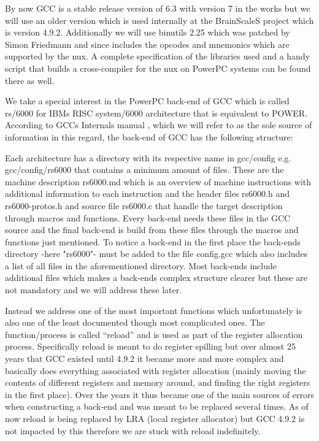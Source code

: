 By now GCC is a stable release version of 6.3 with version 7 in the works but we will use an older version which is used internally at the BrainScaleS project which is version 4.9.2.
Additionally we will use binutils 2.25 which was patched by Simon Friedmann and since includes the opcodes and mnemonics which are supported by the nux.
A complete specification of the libraries used and a handy script that builds a cross-compiler for the nux on PowerPC systems can be found there as well.

We take a special interest in the PowerPC back-end of GCC which is called rs/6000 for IBMs RISC system/6000 architecture that is equivalent to POWER.
According to GCCs Internals manual \cite{GCCint}, which we will refer to as the sole source of information in this regard, the back-end of GCC has the following structure:

Each architecture has a directory with its respective name in gcc/config e.g. gcc/config/rs6000 that contains a minimum amount of files.
These are the machine description rs6000.md which is an overview of machine instructions with additional information to each instruction and the header files rs6000.h and rs6000-protos.h and source file rs6000.c that handle the target description through macros and functions.
Every back-end needs these files in the GCC source and the final back-end is build from these files through the macros and functions just mentioned.
To notice a back-end in the first place the back-ends directory -here "rs6000"- must be added to the file config.gcc which also includes a list of all files in the aforementioned directory.
Most back-ends include additional files which makes a back-ends complex structure clearer but these are not mandatory and we will address these later.

Instead we address one of the most important functions which unfortunately is also one of the least documented though most complicated ones.
The function/process is called ``reload'' and is used as part of the register allocation process. \cite{GCCwiki:reload}
Specifically reload is meant to do register spilling but over almost 25 years that GCC existed until 4.9.2 it became more and more complex and basically does everything associated with register allocation (mainly moving the contents of different registers and memory around, and finding the right registers in the first place).
Over the years it thus became one of the main sources of errors when constructing a back-end and was meant to be replaced several times.
As of now reload is being replaced by LRA (local register allocator) but GCC 4.9.2 is not impacted by this therefore we are stuck with reload indefinitely.

